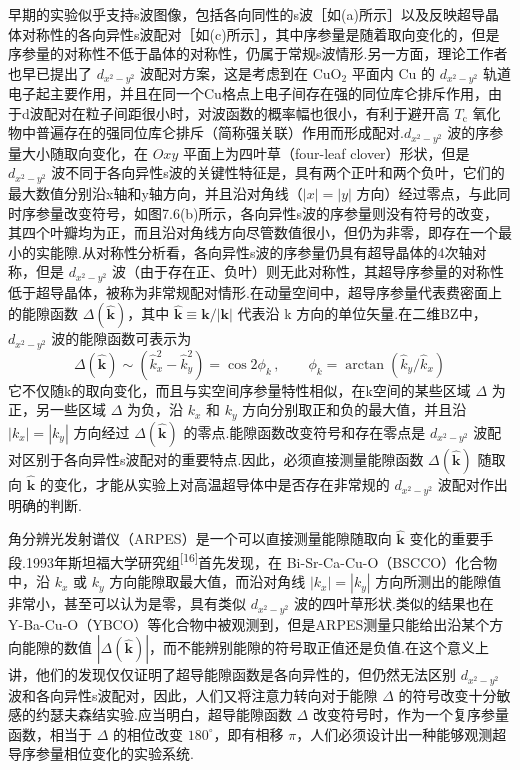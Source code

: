 早期的实验似乎支持s波图像，包括各向同性的s波［如(a)所示］以及反映超导晶体对称性的各向异性s波配对［如(c)所示］，其中序参量是随着取向变化的，但是序参量的对称性不低于晶体的对称性，仍属于常规s波情形.另一方面，理论工作者也早已提出了 $d_{x^{2}-y^{2}}$ 波配对方案，这是考虑到在 $\mathrm{CuO}_{2}$ 平面内 Cu 的 $d_{x^{2}-y^{2}}$ 轨道电子起主要作用，并且在同一个Cu格点上电子间存在强的同位库仑排斥作用，由于d波配对在粒子间距很小时，对波函数的概率幅也很小，有利于避开高 $T_{\mathrm{c}}$ 氧化物中普遍存在的强同位库仑排斥（简称强关联）作用而形成配对.$d_{x^{2}-y^{2}}$ 波的序参量大小随取向变化，在 $Oxy$ 平面上为四叶草（four-leaf clover）形状，但是 $d_{x^{2}-y^{2}}$ 波不同于各向异性s波的关键性特征是，具有两个正叶和两个负叶，它们的最大数值分别沿x轴和y轴方向，并且沿对角线（$|x|=|y|$ 方向）经过零点，与此同时序参量改变符号，如图7.6(b)所示，各向异性s波的序参量则没有符号的改变，其四个叶瓣均为正，而且沿对角线方向尽管数值很小，但仍为非零，即存在一个最小的实能隙.从对称性分析看，各向异性s波的序参量仍具有超导晶体的4次轴对称，但是 $d_{x^{2}-y^{2}}$ 波（由于存在正、负叶）则无此对称性，其超导序参量的对称性低于超导晶体，被称为非常规配对情形.在动量空间中，超导序参量代表费密面上的能隙函数 $\Delta(\hat{\boldsymbol{k}})$，其中 $\hat{\boldsymbol{k}}\equiv\boldsymbol{k}/\left|\boldsymbol{k}\right|$ 代表沿 k 方向的单位矢量.在二维BZ中，$d_{x^{2}-y^{2}}$ 波的能隙函数可表示为
\begin{equation}
  \Delta(\hat{\boldsymbol{k}})\sim\left(\hat{k}_{x}^{2}-\hat{k}_{y}^{2}\right)=\cos2\phi_{k}\,,\qquad
  \phi_{k}=\arctan\left(\hat{k}_{y}/\hat{k}_{x}\right)
\end{equation}
它不仅随k的取向变化，而且与实空间序参量特性相似，在k空间的某些区域 $\Delta$ 为正，另一些区域 $\Delta$ 为负，沿 $k_{x}$ 和 $k_{y}$ 方向分别取正和负的最大值，并且沿 $|k_{x}|=|k_{y}|$ 方向经过 $\Delta(\hat{\boldsymbol{k}})$ 的零点.能隙函数改变符号和存在零点是 $d_{x^{2}-y^{2}}$ 波配对区别于各向异性s波配对的重要特点.因此，必须直接测量能隙函数 $\Delta(\hat{\boldsymbol{k}})$ 随取向 $\hat{\boldsymbol{k}}$ 的变化，才能从实验上对高温超导体中是否存在非常规的 $d_{x^{2}-y^{2}}$ 波配对作出明确的判断.

角分辨光发射谱仪（ARPES）是一个可以直接测量能隙随取向 $\hat{\boldsymbol{k}}$ 变化的重要手段.1993年斯坦福大学研究组\textsuperscript{[16]}首先发现，在 Bi-Sr-Ca-Cu-O（BSCCO）化合物中，沿 $k_{x}$ 或 $k_{y}$ 方向能隙取最大值，而沿对角线 $|k_{x}|=|k_{y}|$ 方向所测出的能隙值非常小，甚至可以认为是零，具有类似 $d_{x^{2}-y^{2}}$ 波的四叶草形状.类似的结果也在 Y-Ba-Cu-O（YBCO）等化合物中被观测到，但是ARPES测量只能给出沿某个方向能隙的数值 $\left|\Delta(\hat{\boldsymbol{k}})\right|$，而不能辨别能隙的符号取正值还是负值.在这个意义上讲，他们的发现仅仅证明了超导能隙函数是各向异性的，但仍然无法区别 $d_{x^{2}-y^{2}}$ 波和各向异性s波配对，因此，人们又将注意力转向对于能隙 $\Delta$ 的符号改变十分敏感的约瑟夫森结实验.应当明白，超导能隙函数 $\Delta$ 改变符号时，作为一个复序参量函数，相当于 $\Delta$ 的相位改变 $180^{\circ}$，即有相移 $\pi$，人们必须设计出一种能够观测超导序参量相位变化的实验系统.

